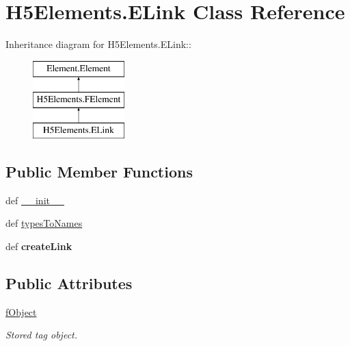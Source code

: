 \hypertarget{classH5Elements_1_1ELink}{
\section{H5Elements.ELink Class Reference}
\label{classH5Elements_1_1ELink}
}
Inheritance diagram for H5Elements.ELink::\begin{figure}[H]
\begin{center}
\leavevmode
\includegraphics[height=3cm]{classH5Elements_1_1ELink}
\end{center}
\end{figure}
\subsection*{Public Member Functions}
\begin{DoxyCompactItemize}
\item 
def \hyperlink{classH5Elements_1_1ELink_a15f6a1e9476b5ef916b597243a79b0e8}{\_\-\_\-init\_\-\_\-}
\item 
def \hyperlink{classH5Elements_1_1ELink_acc66ee4d29d63fd921d96974e45413fc}{typesToNames}
\item 
\hypertarget{classH5Elements_1_1ELink_ad55d058f16bea9ebc8c2a746bf67689a}{
def {\bfseries createLink}}
\label{classH5Elements_1_1ELink_ad55d058f16bea9ebc8c2a746bf67689a}

\end{DoxyCompactItemize}
\subsection*{Public Attributes}
\begin{DoxyCompactItemize}
\item 
\hypertarget{classH5Elements_1_1ELink_a3b71ab0736b0ce0c69d59f91cf6ee107}{
\hyperlink{classH5Elements_1_1ELink_a3b71ab0736b0ce0c69d59f91cf6ee107}{fObject}}
\label{classH5Elements_1_1ELink_a3b71ab0736b0ce0c69d59f91cf6ee107}

\begin{DoxyCompactList}\small\item\em Stored tag object. \item\end{DoxyCompactList}\end{DoxyCompactItemize}


